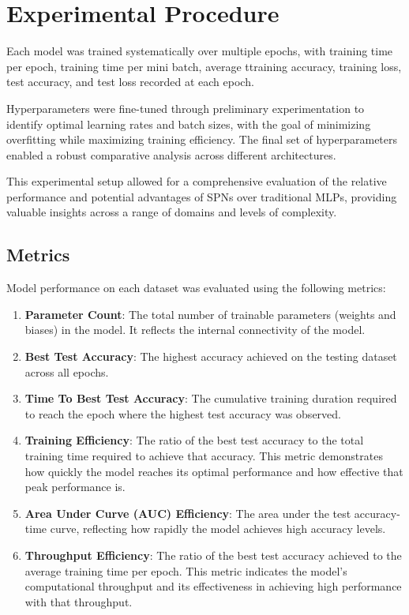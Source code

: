 
\section{Experimental Procedure}

Each model was trained systematically over multiple epochs, with training time per epoch, training time per mini batch, average ttraining accuracy, training loss, test accuracy, and test loss recorded at each epoch.

Hyperparameters were fine-tuned through preliminary experimentation to identify optimal learning rates and batch sizes, with the goal of minimizing overfitting while maximizing training efficiency. The final set of hyperparameters enabled a robust comparative analysis across different architectures.

This experimental setup allowed for a comprehensive evaluation of the relative performance and potential advantages of SPNs over traditional MLPs, providing valuable insights across a range of domains and levels of complexity.

\subsection{Metrics}
Model performance on each dataset was evaluated using the following metrics:
\begin{enumerate}
\item \textbf{Parameter Count}: The total number of trainable parameters (weights and biases) in the model. It reflects the internal connectivity of the model.
\item \textbf{Best Test Accuracy}: The highest accuracy achieved on the testing dataset across all epochs.
\item \textbf{Time To Best Test Accuracy}: The cumulative training duration required to reach the epoch where the highest test accuracy was observed.
\item \textbf{Training Efficiency}: The ratio of the best test accuracy to the total training time required to achieve that accuracy. This metric demonstrates how quickly the model reaches its optimal performance and how effective that peak performance is.
\item \textbf{Area Under Curve (AUC) Efficiency}: The area under the test accuracy-time curve, reflecting how rapidly the model achieves high accuracy levels.
\item \textbf{Throughput Efficiency}: The ratio of the best test accuracy achieved to the average training time per epoch. This metric indicates the model's computational throughput and its effectiveness in achieving high performance with that throughput.
\end{enumerate}

